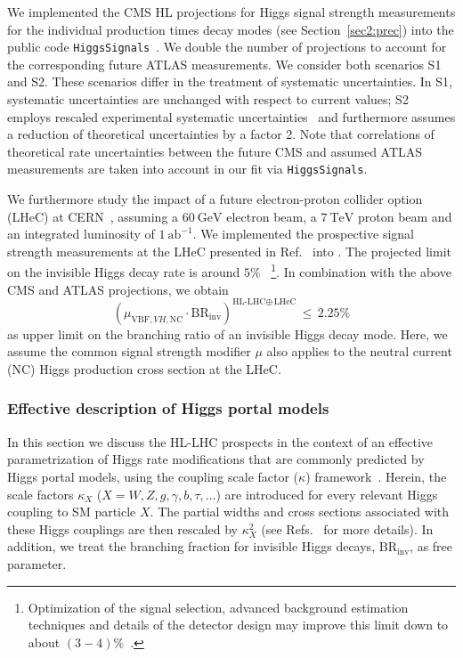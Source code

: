 \documentclass[../report.tex]{subfiles}
\newcommand{\BRHinv}{\mathrm{BR}_\mathrm{inv}}
\begin{document}
We implemented the CMS HL projections for Higgs signal strength measurements for the individual production times decay modes (see Section~\ref{sec2:prec})
into the public code \texttt{HiggsSignals}~\cite{Bechtle:2013xfa,Bechtle:2014ewa}.
We double the number of projections to account for the corresponding future ATLAS measurements.
We consider both scenarios S1 and S2. These scenarios differ in the treatment of systematic uncertainties. In S1, systematic uncertainties are unchanged {with respect to current values}; S2 employs rescaled experimental systematic uncertainties~\cite{uncertpresc}
 and furthermore assumes a reduction of theoretical uncertainties by a factor 2. Note that correlations of theoretical rate uncertainties between the future CMS and assumed ATLAS measurements are taken into account in our fit via \texttt{HiggsSignals}. 



{We furthermore study the impact of a future electron-proton collider option (LHeC) at CERN~\cite{AbelleiraFernandez:2012cc,uta,uta2}, assuming a $60~\mathrm{GeV}$ electron beam, a $7~\mathrm{TeV}$ proton beam and an integrated luminosity of $1~\mathrm{ab}^{-1}$. We implemented the prospective signal strength measurements at the LHeC presented in Ref.~\cite{uta} into \HS. The projected limit on the invisible Higgs decay rate is around $5\%$~\cite{uta,Tang:2015uha,kuzeLHeC,bc1,bc2,uta2} \footnote{Optimization of the signal selection, advanced background estimation techniques and details of the detector design may improve this limit down to about $(3-4)\%$~\cite{Utacommunications}.}.
In combination with the above CMS and ATLAS projections, we obtain
\begin{equation*}
\left(\mu_{\text{VBF},VH,\text{NC}} \cdot \text{BR}_\text{inv}\right)^{\text{HL-LHC}\oplus\,\text{LHeC}}\,\leq\,2.25\%
\end{equation*}
as upper limit on the branching ratio of an invisible Higgs decay mode. {Here, {we assume} the common signal strength modifier $\mu$ also applies to the neutral current (NC) Higgs production cross section at the LHeC.}}


\subsubsection{Effective description of Higgs portal models}
\label{sec6:effC}

In this section we discuss the HL-LHC prospects in the context of an effective parametrization of Higgs rate modifications that are commonly predicted by Higgs portal models, using the coupling scale factor ($\kappa$) framework~\cite{Heinemeyer:2013tqa}.  Herein, the scale factors $\kappa_X$ ($X = W, Z, g, \gamma, b, \tau, \dots$) are introduced for every relevant Higgs coupling to SM particle $X$. The partial widths and cross sections associated with these Higgs couplings are then rescaled by $\kappa^2_X$ (see Refs.~\cite{Heinemeyer:2013tqa,Bechtle:2014ewa} for more details). In addition, we treat the branching fraction for invisible Higgs decays, $\BRHinv$, as free parameter.
\end{document}

